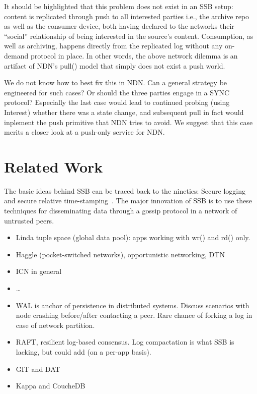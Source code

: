 \documentclass[sigconf]{acmart}
\begin{document}
It should be highlighted that this problem does not exist in an SSB
setup: content is replicated through push to all interested parties
i.e., the archive repo as well as the consumer device, both having
declared to the networks their ``social'' relationship of being
interested in the source's content. Consumption, as well as archiving,
happens directly from the replicated log without any on-demand
protocol in place. In other words, the above network dilemma is an
artifact of NDN's pull() model that simply does not exist a push
world.

We do not know how to best fix this in NDN. Can a general strategy be
engineered for such cases? Or should the three parties engage in a
SYNC protocol? Especially the last case would lead to continued
probing (using Interest) whether there was a state change, and
subsequent pull in fact would inplement the push primitive that NDN
tries to avoid. We suggest that this case merits a closer look at a
push-only service for NDN.


\section{Related Work}

The basic ideas behind SSB can be traced back to the nineties: Secure logging~\cite{schneier1998cryptographic} and secure relative time-stamping~\cite{haber1990time}. The major innovation of SSB is to use these techniques for disseminating data through a gossip protocol in a network of untrusted peers.

\begin{itemize}
\item Linda tuple space (global data pool): apps working with wr() and rd() only.
\item Haggle (pocket-switched networks), opportunistic networking, DTN
\item ICN in general
\item \ldots
\item WAL is anchor of persistence in distributed systems. Discuss scenarios with node crashing before/after contacting a peer. Rare chance of forking a log in case of network partition.
\item RAFT, resilient log-based consensus. Log compactation is what SSB is lacking, but could add (on a per-app basis).
\item GIT and DAT
\item Kappa and CoucheDB
\end{itemize}
\end{document}
